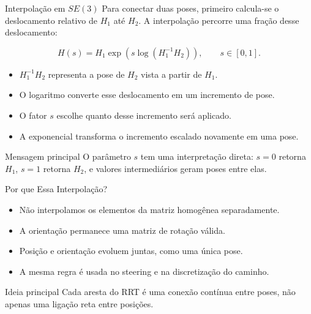 \documentclass[aspectratio=169]{beamer}
\begin{document}
\begin{frame}{Interpolação em \(SE(3)\)}
    \small
    Para conectar duas poses, primeiro calcula-se o deslocamento relativo de
    \(H_1\) até \(H_2\). A interpolação percorre uma fração desse deslocamento:

    \[
    H(s)
    =
    H_1
    \exp\left(
    s\log(H_1^{-1}H_2)
    \right),
    \qquad
    s\in[0,1].
    \]

    \vspace{0.1cm}
    \begin{itemize}
        \item \(H_1^{-1}H_2\) representa a pose de \(H_2\) vista a partir de \(H_1\).
        \item O logaritmo converte esse deslocamento em um incremento de pose.
        \item O fator \(s\) escolhe quanto desse incremento será aplicado.
        \item A exponencial transforma o incremento escalado novamente em uma pose.
    \end{itemize}

    \vspace{0.15cm}
    \begin{block}{Mensagem principal}
        O parâmetro \(s\) tem uma interpretação direta: \(s=0\) retorna \(H_1\),
        \(s=1\) retorna \(H_2\), e valores intermediários geram poses entre elas.
    \end{block}
\end{frame}

\begin{frame}{Por que Essa Interpolação?}
    \begin{itemize}
        \item Não interpolamos os elementos da matriz homogênea separadamente.
        \item A orientação permanece uma matriz de rotação válida.
        \item Posição e orientação evoluem juntas, como uma única pose.
        \item A mesma regra é usada no steering e na discretização do caminho.
    \end{itemize}

    \vspace{0.25cm}
    \begin{block}{Ideia principal}
        Cada aresta do RRT é uma conexão contínua entre poses, não apenas uma
        ligação reta entre posições.
    \end{block}
\end{frame}
\end{document}
